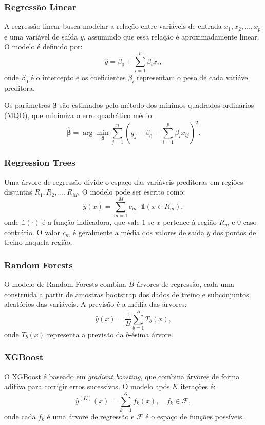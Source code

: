 \documentclass{article}
\begin{document}
\subsubsection{Regressão Linear}

A regressão linear busca modelar a relação entre variáveis de entrada $x_1, x_2, \dots, x_p$ e uma variável de saída $y$, assumindo que essa relação é aproximadamente linear. O modelo é definido por:
\[
\hat{y} = \beta_0 + \sum_{i=1}^p \beta_i x_i,
\]
onde $\beta_0$ é o intercepto e os coeficientes $\beta_i$ representam o peso de cada variável preditora.  

Os parâmetros $\boldsymbol{\beta}$ são estimados pelo método dos mínimos quadrados ordinários (MQO), que minimiza o erro quadrático médio:
\[
\hat{\boldsymbol{\beta}} = \arg \min_{\boldsymbol{\beta}} \sum_{j=1}^n \left(y_j - \beta_0 - \sum_{i=1}^p \beta_i x_{ij}\right)^2.
\]



\subsubsection{Regression Trees}

Uma árvore de regressão divide o espaço das variáveis preditoras em regiões disjuntas $R_1, R_2, \dots, R_M$.  
O modelo pode ser escrito como:
\[
\hat{y}(x) = \sum_{m=1}^M c_m \cdot \mathbb{1}(x \in R_m),
\]
onde $\mathbb{1}(\cdot)$ é a função indicadora, que vale 1 se $x$ pertence à região $R_m$ e 0 caso contrário.  
O valor $c_m$ é geralmente a média dos valores de saída $y$ dos pontos de treino naquela região.



\subsubsection{Random Forests}

O modelo de Random Forests combina $B$ árvores de regressão, cada uma construída a partir de amostras bootstrap dos dados de treino e subconjuntos aleatórios das variáveis. A previsão é a média das árvores:
\[
\hat{y}(x) = \frac{1}{B} \sum_{b=1}^B T_b(x),
\]
onde $T_b(x)$ representa a previsão da $b$-ésima árvore.  



\subsubsection{XGBoost}

O XGBoost é baseado em \textit{gradient boosting}, que combina árvores de forma aditiva para corrigir erros sucessivos. O modelo após $K$ iterações é:
\[
\hat{y}^{(K)}(x) = \sum_{k=1}^K f_k(x), \quad f_k \in \mathcal{F},
\]
onde cada $f_k$ é uma árvore de regressão e $\mathcal{F}$ é o espaço de funções possíveis.  
\end{document}
